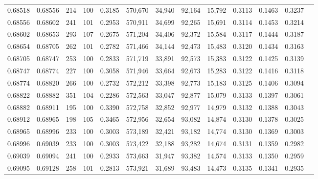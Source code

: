 \begin{tabular}{rrrrrrrrrrrrr}
0.68518 & 0.68556 &   214 & 100 &                                     0.3185 & 570,670 &  34,940 &  92,164 &  15,792 & 0.3113 & 0.1463 & 0.3237 \\
0.68556 & 0.68602 &   241 & 101 &                                     0.2953 & 570,911 &  34,699 &  92,265 &  15,691 & 0.3114 & 0.1453 & 0.3214 \\
0.68602 & 0.68653 &   293 & 107 &                                     0.2675 & 571,204 &  34,406 &  92,372 &  15,584 & 0.3117 & 0.1444 & 0.3187 \\
0.68654 & 0.68705 &   262 & 101 &                                     0.2782 & 571,466 &  34,144 &  92,473 &  15,483 & 0.3120 & 0.1434 & 0.3163 \\
0.68705 & 0.68747 &   253 & 100 &                                     0.2833 & 571,719 &  33,891 &  92,573 &  15,383 & 0.3122 & 0.1425 & 0.3139 \\
0.68747 & 0.68774 &   227 & 100 &                                     0.3058 & 571,946 &  33,664 &  92,673 &  15,283 & 0.3122 & 0.1416 & 0.3118 \\
0.68774 & 0.68820 &   266 & 100 &                                     0.2732 & 572,212 &  33,398 &  92,773 &  15,183 & 0.3125 & 0.1406 & 0.3094 \\
0.68822 & 0.68882 &   351 & 104 &                                     0.2286 & 572,563 &  33,047 &  92,877 &  15,079 & 0.3133 & 0.1397 & 0.3061 \\
0.68882 & 0.68911 &   195 & 100 &                                     0.3390 & 572,758 &  32,852 &  92,977 &  14,979 & 0.3132 & 0.1388 & 0.3043 \\
0.68912 & 0.68965 &   198 & 105 &                                     0.3465 & 572,956 &  32,654 &  93,082 &  14,874 & 0.3130 & 0.1378 & 0.3025 \\
0.68965 & 0.68996 &   233 & 100 &                                     0.3003 & 573,189 &  32,421 &  93,182 &  14,774 & 0.3130 & 0.1369 & 0.3003 \\
0.68996 & 0.69039 &   233 & 100 &                                     0.3003 & 573,422 &  32,188 &  93,282 &  14,674 & 0.3131 & 0.1359 & 0.2982 \\
0.69039 & 0.69094 &   241 & 100 &                                     0.2933 & 573,663 &  31,947 &  93,382 &  14,574 & 0.3133 & 0.1350 & 0.2959 \\
0.69095 & 0.69128 &   258 & 101 &                                     0.2813 & 573,921 &  31,689 &  93,483 &  14,473 & 0.3135 & 0.1341 & 0.2935 \\

\end{tabular}
